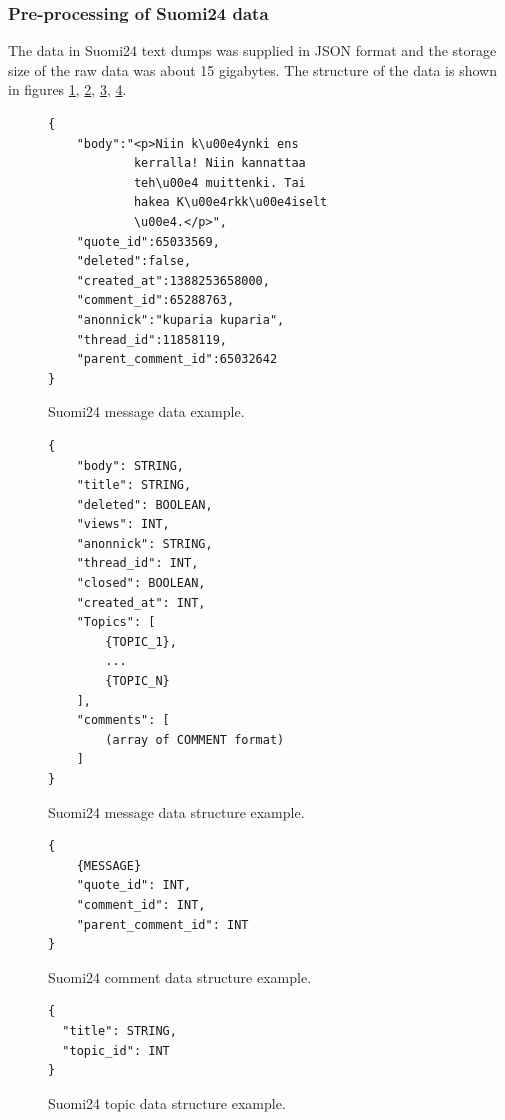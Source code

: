 \documentclass[conference]{IEEEtran}
\begin{document}
\subsubsection{Pre-processing of Suomi24 data}
The data in Suomi24 text dumps was supplied in JSON format and the storage size of the raw data was about 15 gigabytes. The structure of the data is shown in figures \ref{message_data_example}, \ref{message_data_structure}, \ref{comment_data_structure}, \ref{topic_data_structure}.

\begin{figure}[htbp]
    \begin{lstlisting}
{
    "body":"<p>Niin k\u00e4ynki ens
            kerralla! Niin kannattaa
            teh\u00e4 muittenki. Tai
            hakea K\u00e4rkk\u00e4iselt
            \u00e4.</p>",
    "quote_id":65033569,
    "deleted":false,
    "created_at":1388253658000,
    "comment_id":65288763,
    "anonnick":"kuparia kuparia",
    "thread_id":11858119,
    "parent_comment_id":65032642
}
\end{lstlisting}
    \caption{Suomi24 message data example.}
    \label{message_data_example}
\end{figure}

\begin{figure}[htbp]
    \begin{lstlisting}
{
    "body": STRING,
    "title": STRING,
    "deleted": BOOLEAN,
    "views": INT,
    "anonnick": STRING,
    "thread_id": INT,
    "closed": BOOLEAN,
    "created_at": INT,
    "Topics": [
        {TOPIC_1},
        ...
        {TOPIC_N}
    ],
    "comments": [
        (array of COMMENT format)
    ]
}
\end{lstlisting}
    \caption{Suomi24 message data structure example.}
    \label{message_data_structure}
\end{figure}

\begin{figure}[htbp]
    \begin{lstlisting}
{
    {MESSAGE}
    "quote_id": INT,
    "comment_id": INT,
    "parent_comment_id": INT
}
\end{lstlisting}
    \caption{Suomi24 comment data structure example.}
    \label{comment_data_structure}
\end{figure}

\begin{figure}[htbp]
    \begin{lstlisting}
{
  "title": STRING,
  "topic_id": INT
}
\end{lstlisting}
    \caption{Suomi24 topic data structure example.}
    \label{topic_data_structure}
\end{figure}
\end{document}
